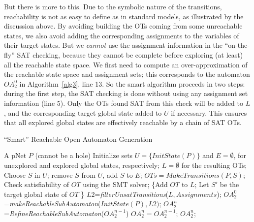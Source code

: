 \documentclass[smallcondensed]{svjour3}
\begin{document}
But there is more to this. Due to the symbolic nature of the
  transitions, reachability is not as easy to define as in standard
  models, as illustrated by the discussion above. By avoiding building
  the OTs coming from some unreachable states, we also avoid adding
  the corresponding assignments to the variables of their target states.
But we \emph{cannot} use the
assignment information in the ``on-the-fly'' SAT checking, because
they cannot be complete before exploring (at least) all the reachable
state space. We first need to compute an over-approximation of
the reachable state space and assignment sets; this corresponds to
the automaton $OA_2^0$ in Algorithm~\ref{alg3}, line 13.
So the smart algorithm proceeds in two steps: during the
first step, the SAT checking is done without using any assignment set
information (line 5).  Only the OTs found SAT from this check will be added
to $L$, and the corresponding target global state added to $U$ if
necessary. This ensures that all explored global states are
effectively reachable by a chain of SAT OTs.
 
\begin{algorithm}[h]
  \caption{``Smart'' Reachable Open Automaton Generation}
  \label{alg3}
\begin{algorithmic}[1]
\Require A pNet $P$ (cannot be a hole)
\State Initialize sets $U=\{\mathit{InitState}(P)\}$ and $E=\emptyset$,
for unexplored and explored global states, respectively; $L=\emptyset$ for the resulting OTs;
	\State Choose $S$ in $U$; remove $S$ from $U$, add $S$ to $E$;
	\State $\mathit{OTs} = \mathit{MakeTransitions}(P, S)$;
        Check satisfiability of $\mathit{OT}$ using the SMT solver;
                {\State \{Add $\mathit{OT}$ to $L$;
                  \State Let $S'$ be the target global state of $\mathit{OT}$
                  \}}
	\EndFor
\EndWhile
\State $\mathit{L2}$=\textit{filterUnsatTransitions}($\mathit{L,Assignments}$);
\State $\mathit{OA_2^0}$=\textit{makeReachableSubAutomaton}($\mathit{InitState}(P),L2)$;
\Repeat $\mathit{OA_2^n}$=\textit{RefineReachableSubAutomaton}($\mathit{OA_2^{n-1}}$)
\Until  $\mathit{OA_2^n}=\mathit{OA_2^{n-1}}$;
\State \Return $\mathit{OA_2^n}$;
\end{algorithmic}  
\end{algorithm}
\end{document}
